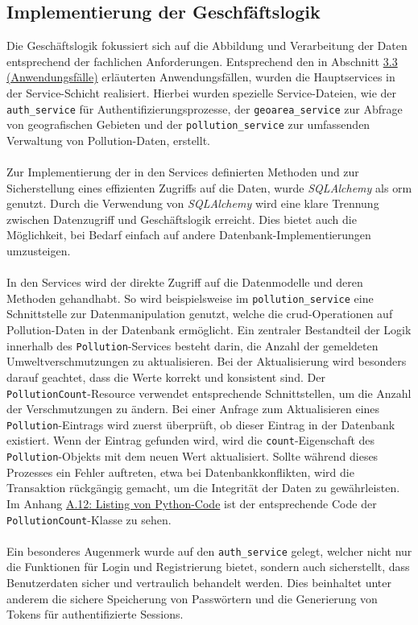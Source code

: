 \documentclass[a4paper,12pt]{article}
\begin{document}
\subsection{Implementierung der Geschfäftslogik}
Die Geschäftslogik fokussiert sich auf die Abbildung und Verarbeitung der Daten entsprechend der fachlichen Anforderungen. Entsprechend den in Abschnitt \hyperref[sec:anwendungsfälle]{3.3 (Anwendungsfälle)} erläuterten Anwendungsfällen, wurden die Hauptservices in der Service-Schicht realisiert. Hierbei wurden spezielle Service-Dateien, wie der \texttt{auth\_service} für Authentifizierungsprozesse, der \texttt{geoarea\_service} zur Abfrage von geografischen Gebieten und der \texttt{pollution\_service} zur umfassenden Verwaltung von Pollution-Daten, erstellt.\\
\\
Zur Implementierung der in den Services definierten Methoden und zur Sicherstellung eines effizienten Zugriffs auf die Daten, wurde \textit{SQLAlchemy} als \acrshort{orm} genutzt. Durch die Verwendung von \textit{SQLAlchemy} wird eine klare Trennung zwischen Datenzugriff und Geschäftslogik erreicht. Dies bietet auch die Möglichkeit, bei Bedarf einfach auf andere Datenbank-Implementierungen umzusteigen.\\
\\
In den Services wird der direkte Zugriff auf die Datenmodelle und deren Methoden gehandhabt. So wird beispielsweise im \texttt{pollution\_service} eine Schnittstelle zur Datenmanipulation genutzt, welche die \acrshort{crud}-Operationen auf Pollution-Daten in der Datenbank ermöglicht. Ein zentraler Bestandteil der Logik innerhalb des \texttt{Pollution}-Services besteht darin, die Anzahl der gemeldeten Umweltverschmutzungen zu aktualisieren. Bei der Aktualisierung wird besonders darauf geachtet, dass die Werte korrekt und konsistent sind. Der \texttt{PollutionCount}-Resource verwendet entsprechende Schnittstellen, um die Anzahl der Verschmutzungen zu ändern. Bei einer Anfrage zum Aktualisieren eines \texttt{Pollution}-Eintrags wird zuerst überprüft, ob dieser Eintrag in der Datenbank existiert. Wenn der Eintrag gefunden wird, wird die \texttt{count}-Eigenschaft des \texttt{Pollution}-Objekts mit dem neuen Wert aktualisiert. Sollte während dieses Prozesses ein Fehler auftreten, etwa bei Datenbankkonflikten, wird die Transaktion rückgängig gemacht, um die Integrität der Daten zu gewährleisten. Im Anhang \hyperref[sec:python-code]{A.12: Listing von Python-Code} ist der entsprechende Code der \texttt{PollutionCount}-Klasse zu sehen.\\
\\
Ein besonderes Augenmerk wurde auf den \texttt{auth\_service} gelegt, welcher nicht nur die Funktionen für Login und Registrierung bietet, sondern auch sicherstellt, dass Benutzerdaten sicher und vertraulich behandelt werden. Dies beinhaltet unter anderem die sichere Speicherung von Passwörtern und die Generierung von Tokens für authentifizierte Sessions.
\end{document}
